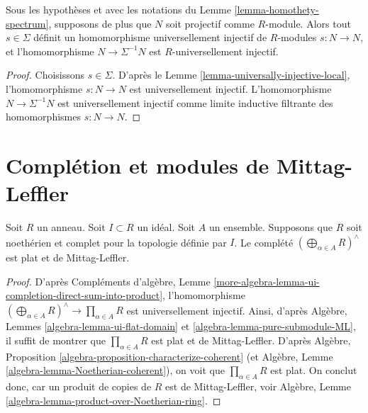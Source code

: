 \begin{lemma}
\label{lemma-invert-universally-injective}
Sous les hypothèses et avec les notations du
Lemme \ref{lemma-homothety-spectrum},
supposons de plus que $N$ soit projectif comme $R$-module.
Alors tout $s \in \Sigma$ définit un
homomorphisme universellement injectif de $R$-modules $s : N \to N$, et
l'homomorphisme $N \to \Sigma^{-1}N$ est $R$-universellement injectif.
\end{lemma}

\begin{proof}
Choisissons $s \in \Sigma$. D'après le
Lemme \ref{lemma-universally-injective-local},
l'homomorphisme $s : N \to N$ est universellement injectif.
L'homomorphisme $N \to \Sigma^{-1}N$ est universellement injectif comme limite
inductive filtrante des homomorphismes $s : N \to N$.
\end{proof}






\section{Complétion et modules de Mittag-Leffler}
\label{section-completion-ML}


\begin{lemma}
\label{lemma-completed-direct-sum-ML}
Soit $R$ un anneau. Soit $I \subset R$ un idéal. Soit $A$ un ensemble.
Supposons que $R$ soit noethérien et complet pour la topologie définie par $I$. Le complété
$(\bigoplus\nolimits_{\alpha \in A} R)^\wedge$
est plat et de Mittag-Leffler.
\end{lemma}

\begin{proof}
D'après
Compléments d'algèbre, Lemme
\ref{more-algebra-lemma-ui-completion-direct-sum-into-product},
l'homomorphisme $(\bigoplus\nolimits_{\alpha \in A} R)^\wedge
\to \prod_{\alpha \in A} R$ est universellement injectif.
Ainsi, d'après
Algèbre, Lemmes \ref{algebra-lemma-ui-flat-domain} et
\ref{algebra-lemma-pure-submodule-ML},
il suffit de montrer que $\prod_{\alpha \in A} R$ est plat et de Mittag-Leffler.
D'après
Algèbre, Proposition \ref{algebra-proposition-characterize-coherent}
(et
Algèbre, Lemme \ref{algebra-lemma-Noetherian-coherent}),
on voit que $\prod_{\alpha \in A} R$ est plat.
On conclut donc, car un produit de copies de $R$ est de Mittag-Leffler, voir
Algèbre, Lemme \ref{algebra-lemma-product-over-Noetherian-ring}.
\end{proof}

